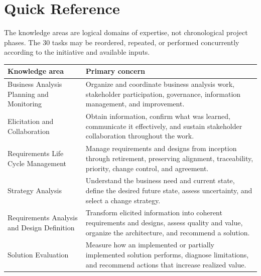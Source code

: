 \documentclass[11pt]{article}
\begin{document}
\section{Quick Reference}
The knowledge areas are logical domains of expertise, not chronological project phases. The 30 tasks may be reordered, repeated, or performed concurrently according to the initiative and available inputs.
\begin{longtable}{L{0.28\textwidth} L{0.55\textwidth}}
\toprule
\textbf{Knowledge area} & \textbf{Primary concern}\\
\midrule
Business Analysis Planning and Monitoring & Organize and coordinate business analysis work, stakeholder participation, governance, information management, and improvement.\\
Elicitation and Collaboration & Obtain information, confirm what was learned, communicate it effectively, and sustain stakeholder collaboration throughout the work.\\
Requirements Life Cycle Management & Manage requirements and designs from inception through retirement, preserving alignment, traceability, priority, change control, and agreement.\\
Strategy Analysis & Understand the business need and current state, define the desired future state, assess uncertainty, and select a change strategy.\\
Requirements Analysis and Design Definition & Transform elicited information into coherent requirements and designs, assess quality and value, organize the architecture, and recommend a solution.\\
Solution Evaluation & Measure how an implemented or partially implemented solution performs, diagnose limitations, and recommend actions that increase realized value.\\
\bottomrule
\end{longtable}
\end{document}
